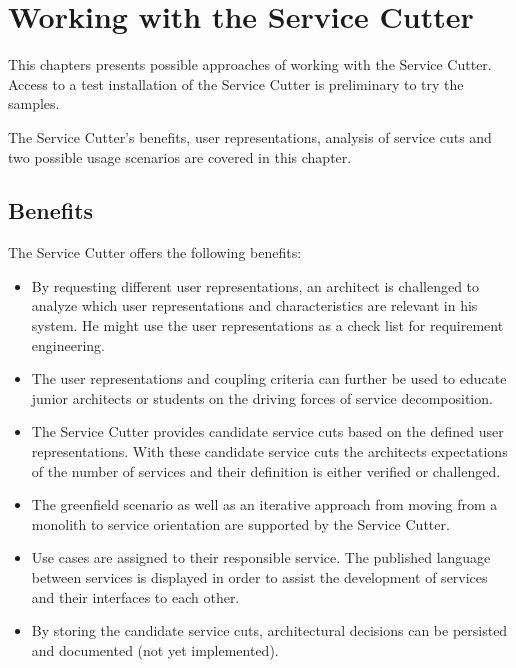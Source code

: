 \chapter{Working with the Service Cutter} 

This chapters presents possible approaches of working with the Service Cutter. Access to a test installation of the Service Cutter is preliminary to try the samples.

The Service Cutter's benefits, user representations, analysis of service cuts and two possible usage scenarios are covered in this chapter.

\section{Benefits}

The Service Cutter offers the following benefits:

\begin{itemize}
	\item By requesting different user representations, an architect is challenged to analyze which user representations and characteristics are relevant in his system. He might use the user representations as a check list for requirement engineering.
	\item The user representations and coupling criteria can further be used to educate junior architects or students on the driving forces of service decomposition.
	\item The Service Cutter provides candidate service cuts based on the defined user representations. With these candidate service cuts the architects expectations of the number of services and their definition is either verified or challenged. 
	\item The greenfield scenario as well as an iterative approach from moving from a monolith to service orientation are supported by the Service Cutter.
	\item Use cases are assigned to their responsible service. The published language between services is displayed in order to assist the development of services and their interfaces to each other.
	\item By storing the candidate service cuts, architectural decisions can be persisted and documented (not yet implemented).
\end{itemize}



